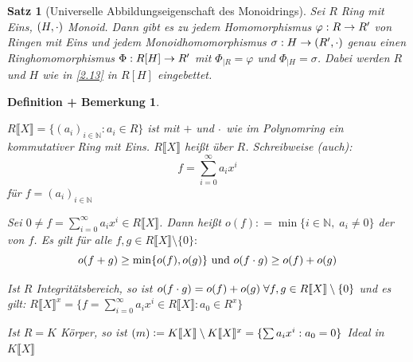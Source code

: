 \documentclass[a4paper,10pt,german]{scrbook}
\theoremstyle{saetze}
\newtheorem{Satz}{Satz}
\theoremstyle{definitionen}
\newtheorem{DefBem}[Def]{Definition + Bemerkung}
\begin{document}
\begin{Satz}[Universelle Abbildungseigenschaft des Monoidrings]
Sei $R$ Ring mit Eins, $(H,\cdot)$ Monoid. Dann gibt es zu jedem
Homomorphismus $\varphi: R \rightarrow R'$ von Ringen mit Eins und jedem
Monoidhomomorphismus $\sigma: H\rightarrow (R',\cdot)$ genau einen
Ringhomomorphismus $\Phi: R[H] \rightarrow R'$ mit $\Phi_{|R} = \varphi$ und
$\Phi_{|H} = \sigma$. Dabei werden $R$ und $H$ wie in \ref{2.13} in
$R[H]$ eingebettet. 
\end{Satz}

\begin{DefBem}
\begin{enum}
\item $R\llbracket X\rrbracket = \{ (a_i)_{i \in \mathbb{N}}: a_i \in
R\}$ ist mit $+$ und $\cdot$ wie im Polynomring ein kommutativer Ring
mit Eins. $R\llbracket X\rrbracket$ heißt  über $R$.
\newline Schreibweise (auch): \[f = \sum_{i=0}^\infty a_i x^i\] für
$f=(a_i)_{i \in \mathbb{N}}$
\item Sei $0 \neq f = \sum_{i=0}^\infty a_i x^i \in
R\llbracket X\rrbracket$. Dann heißt $o(f) \mathrel{\mathop:}=
\min\{i \in \mathbb{N},\; a_i \neq 0 \}$ der  von
$f$. Es gilt für alle $f,g \in R\llbracket X\rrbracket \setminus
\{0\}:$ \[o(f+g) \geq \min \{o(f), o(g)\} \mbox{ und } o(f\cdot g)
\geq o(f) + o(g)\]

\item Ist $R$ Integritätsbereich, so ist $o(f\cdot g) = o(f) + o(g)\;
\forall f,g \in R\llbracket X\rrbracket \setminus \{0\}$ und es
gilt: $R\llbracket X\rrbracket^x = \{ f = \sum_{i=0}^\infty a_i x^i
\in R\llbracket X\rrbracket : a_0 \in R^x \}$

\item Ist $R = K$ Körper, so ist $\mathcal(m) \mathrel{\mathop:}= K\llbracket
X\rrbracket \setminus K\llbracket X\rrbracket^x = \{ \sum a_i x^i :
a_0 = 0\}$ Ideal in $K\llbracket X\rrbracket$

\end{enum}
\end{DefBem}
\end{document}
